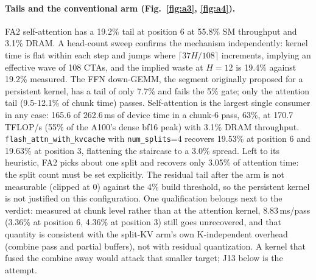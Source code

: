 \documentclass[10pt,a4paper]{article}
\begin{document}
\paragraph{Tails and the conventional arm (Fig.~\ref{fig:a3}, \ref{fig:a4}).} FA2 self-attention has a 19.2\% tail at position 6 at 55.8\% SM throughput and 3.1\% DRAM. A head-count sweep confirms the mechanism independently: kernel time is flat within each step and jumps where $\lceil 37H/108\rceil$ increments, implying an effective wave of 108 CTAs, and the implied waste at $H=12$ is 19.4\% against 19.2\% measured. The FFN down-GEMM, the segment originally proposed for a persistent kernel, has a tail of only 7.7\% and fails the 5\% gate; only the attention tail (9.5-12.1\% of chunk time) passes. Self-attention is the largest single consumer in any case: 165.6 of 262.6\,ms of device time in a chunk-6 pass, 63\%, at 170.7\,TFLOP/s (55\% of the A100's dense bf16 peak) with 3.1\% DRAM throughput. \texttt{flash\_attn\_with\_kvcache} with \texttt{num\_splits}=4 recovers 19.53\% at position 6 and 19.63\% at position 3, flattening the staircase to a 3.0\% spread. Left to its heuristic, FA2 picks about one split and recovers only 3.05\% of attention time: the split count must be set explicitly. The residual tail after the arm is not measurable (clipped at 0) against the 4\% build threshold, so the persistent kernel is not justified on this configuration. One qualification belongs next to the verdict: measured at chunk level rather than at the attention kernel, 8.83\,ms/pass (3.36\% at position 6, 4.36\% at position 3) still goes unrecovered, and that quantity is consistent with the split-KV arm's own K-independent overhead (combine pass and partial buffers), not with residual quantization. A kernel that fused the combine away would attack that smaller target; J13 below is the attempt.
\end{document}
